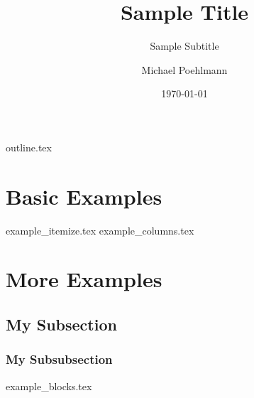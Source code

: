 \documentclass[aspectratio=1610, t]{beamer}  %
\title{Sample Title}
\subtitle{Sample Subtitle}
\author[M. Poehlmann]{Michael Poehlmann}
\institute{UC Davis}
\date{\today}
\begin{document}
\frame{\titlepage}
{outline.tex}

\section{Basic Examples}
\frame{\sectionpage}
{example_itemize.tex}
{example_columns.tex}

\section{More Examples}
\frame{\sectionpage}
\subsection{My Subsection}
\frame{\subsectionpage}
\subsubsection{My Subsubsection}
{example_blocks.tex}
\end{document}

